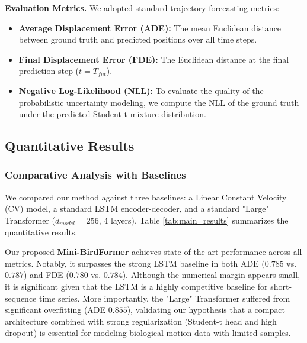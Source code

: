 \documentclass[11pt]{article}
\begin{document}
\textbf{Evaluation Metrics.} We adopted standard trajectory forecasting metrics:
\begin{itemize}
	\item \textbf{Average Displacement Error (ADE):} The mean Euclidean distance between ground truth and predicted positions over all time steps.
	\item \textbf{Final Displacement Error (FDE):} The Euclidean distance at the final prediction step ($t=T_{fut}$).
	\item \textbf{Negative Log-Likelihood (NLL):} To evaluate the quality of the probabilistic uncertainty modeling, we compute the NLL of the ground truth under the predicted Student-t mixture distribution.
\end{itemize}

\subsection{Quantitative Results}

\subsubsection{Comparative Analysis with Baselines}
We compared our method against three baselines: a Linear Constant Velocity (CV) model, a standard LSTM encoder-decoder, and a standard "Large" Transformer ($d_{model}=256$, 4 layers). 
Table \ref{tab:main_results} summarizes the quantitative results. 

Our proposed \textbf{Mini-BirdFormer} achieves state-of-the-art performance across all metrics. Notably, it surpasses the strong LSTM baseline in both ADE ($0.785$ vs. $0.787$) and FDE ($0.780$ vs. $0.784$). Although the numerical margin appears small, it is significant given that the LSTM is a highly competitive baseline for short-sequence time series. 
More importantly, the "Large" Transformer suffered from significant overfitting (ADE $0.855$), validating our hypothesis that a compact architecture combined with strong regularization (Student-t head and high dropout) is essential for modeling biological motion data with limited samples.
\end{document}
